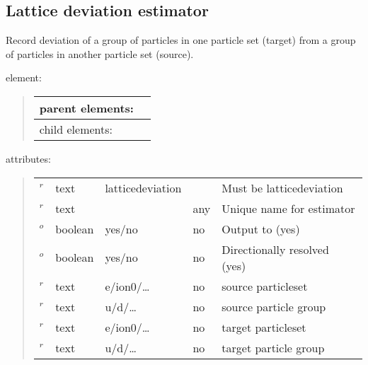 \documentclass[letterpaper,10pt,english]{sphinxmanual}
\begin{document}
\subsection{Lattice deviation estimator}
\label{\detokenize{hamiltonianobservable:lattice-deviation-estimator}}
Record deviation of a group of particles in one particle set (target) from a group of particles in another particle set (source).

 element:
\begin{quote}


\begin{savenotes}\sphinxattablestart
\centering
\begin{tabulary}{\linewidth}[t]{|T|T|}
\hline

parent elements:
&
\\
\hline
child elements:
&
\\
\hline
\end{tabulary}
\par
\sphinxattableend\end{savenotes}
\end{quote}

attributes:
\begin{quote}


\begin{savenotes}\sphinxattablestart
\centering
\begin{tabulary}{\linewidth}[t]{|T|T|T|T|T|}
\hline
\sphinxstyletheadfamily 
{}
&\sphinxstyletheadfamily 
{}
&\sphinxstyletheadfamily 
{}
&\sphinxstyletheadfamily 
{}
&\sphinxstyletheadfamily 
{}
\\
\hline
{}\(^r\)
&
text
&
latticedeviation
&&
Must be latticedeviation
\\
\hline
{}\(^r\)
&
text
&
&
any
&
Unique name for estimator
\\
\hline
{}\(^o\)
&
boolean
&
yes/no
&
no
&
Output to  (yes)
\\
\hline
{}\(^o\)
&
boolean
&
yes/no
&
no
&
Directionally resolved (yes)
\\
\hline
{}\(^r\)
&
text
&
e/ion0/…
&
no
&
source particleset
\\
\hline
{}\(^r\)
&
text
&
u/d/…
&
no
&
source particle group
\\
\hline
{}\(^r\)
&
text
&
e/ion0/…
&
no
&
target particleset
\\
\hline
{}\(^r\)
&
text
&
u/d/…
&
no
&
target particle group
\\
\hline
\end{tabulary}
\par
\sphinxattableend\end{savenotes}
\end{quote}
\end{document}
